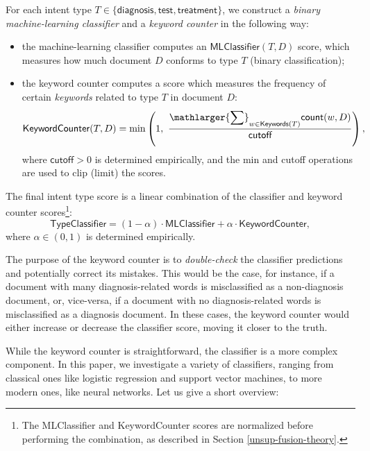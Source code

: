 For each intent type $T\in\{\textsf{diagnosis}, \textsf{test}, \textsf{treatment}\}$,
we construct a \emph{binary machine-learning classifier} and a \emph{keyword counter} in the following way:
\begin{itemize}
 \item the machine-learning classifier computes an $\textsf{MLClassifier}(T,D)$ score,
 which measures how much document $D$ conforms to type $T$ (binary classification);
 \item the keyword counter computes a score which measures the frequency of certain \emph{keywords} related to type $T$ in document $D$:
 \begin{equation}\label{basic-formula}
  \textsf{KeywordCounter}(T,D) = \min\left(1,\,\, \displaystyle\frac{\displaystyle\mathlarger{\sum}_{w\in \textsf{Keywords}(T)} \textsf{count}(w,D)}{\textsf{cutoff}}\right),
 \end{equation}
  where $\textsf{cutoff} > 0$ is determined empirically, and the \textsf{min} and \textsf{cutoff} operations are used to
  clip (limit) the scores.
\end{itemize}

The final intent type score is a linear combination of the classifier and keyword counter scores\footnote{The \textsf{MLClassifier} and \textsf{KeywordCounter}
scores are normalized before performing the combination, as described in Section \ref{unsup-fusion-theory}.}:
\begin{equation}\label{clf-combine-formula}
 \textsf{TypeClassifier} = (1-\alpha)\cdot\textsf{MLClassifier} + \alpha\cdot\textsf{KeywordCounter},
\end{equation}
where $\alpha\in (0,1)$ is determined empirically.

The purpose of the keyword counter is to \emph{double-check} the classifier predictions and potentially correct its mistakes.
This would be the case, for instance,
if a document with many diagnosis-related words is misclassified as a non-diagnosis document,
or, vice-versa, if a document with no diagnosis-related words is misclassified as a diagnosis document.
In these cases, the keyword counter would either increase or decrease the classifier score, moving it closer to the truth.


While the keyword counter is straightforward, the classifier is a more complex component. In this paper, we investigate
a variety of classifiers, ranging from classical ones like logistic regression and support vector machines, to more modern
ones, like neural networks. Let us give a short overview:

